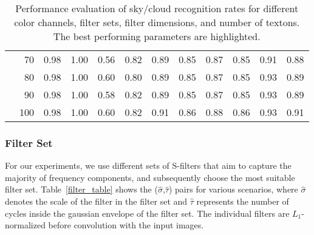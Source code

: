 \begin{table}[htb]
\begin{tabular}{ |rr||L|L|L|L|L|L|L|L|L|L| }
& 70 & 0.98 & 1.00& 0.56 & 0.82 & 0.89 & 0.85 & 0.87 &	0.85 & 0.91 & 0.88 \\ %
& 80 & 0.98 & 	1.00 &	0.60 &	0.80 &	0.89 &	0.85 &	0.87 &	0.85 &	0.93 &	0.89 \\ %
& 90 & 0.98 & 1.00& 0.58 & 0.82 & 0.89 & 0.85 & 0.87 &	0.85 & 0.93 & 0.89 \\ %
& 100 & 0.98 & 1.00& 0.60 & 0.82 & 0.91 & 0.86 & 0.88 &	0.86 & 0.93 & 0.91 \\ %
\hline
\end{tabular}
\caption[Extensive evaluation of different parameters in our proposed cloud classification approach.]{Performance evaluation of sky/cloud recognition rates for different color channels, filter sets, filter dimensions, and number of textons. The best performing parameters are highlighted.}
\label{tab:perform-eval}
\end{table}


\subsubsection{Filter Set}
For our experiments, we use different sets of S-filters that aim to capture the majority of frequency components, and subsequently choose the most suitable filter set. Table~\ref{filter_table} shows the ($\hat{\sigma}$,$\hat{\tau}$) pairs for various scenarios, where $\hat{\sigma}$ denotes the scale of the filter in the filter set and $\hat{\tau}$ represents the number of cycles inside the gaussian envelope of the filter set. The individual filters are $L_1$-normalized before convolution with the input images. 

